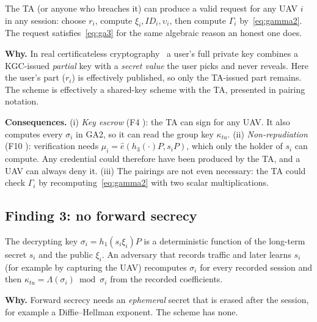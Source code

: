 \begin{flawbox}[title={Key escrow and no non-repudiation (Table II claims F4 and F10 do not hold)}]
\begin{finding}\label{f:escrow}
The TA (or anyone who breaches it) can produce a valid request for any UAV $i$ in any session: choose $r_i$, compute
$\xi_i,ID_i,\upsilon_i$, then compute $\Gamma_i$ by~\eqref{eq:gamma2}. The request satisfies~\eqref{eq:ga3} for the same algebraic reason an honest one does.
\end{finding}
\textbf{Why.} In real certificateless cryptography~\cite{alriyami} a user's full private key combines a KGC-issued \emph{partial} key with a
\emph{secret value} the user picks and never reveals. Here the user's part ($r_i$) is effectively published, so only the TA-issued part remains.
The scheme is effectively a shared-key scheme with the TA, presented in pairing notation.

\textbf{Consequences.}
(i) \emph{Key escrow} (F4 \no): the TA can sign for any UAV. It also computes every $\sigma_i$ in GA2, so it can read the group key $\kappa_{tu}$.
(ii) \emph{Non-repudiation} (F10 \no): verification needs $\mu_i=\hat e(h_3(\cdot)P,s_iP)$, which only the holder of $s_i$ can compute. Any
credential could therefore have been produced by the TA, and a UAV can always deny it.
(iii) The pairings are not even necessary: the TA could check $\Gamma_i$ by recomputing~\eqref{eq:gamma2} with two scalar multiplications.
\end{flawbox}

\subsection{Finding 3: no forward secrecy}
\begin{flawbox}[title={One leaked $s_i$ exposes every past group key (Table II claim F7 does not hold)}]
\begin{finding}\label{f:fs}
The decrypting key $\sigma_i=h_1(s_i\xi_i)P$ is a deterministic function of the long-term secret $s_i$ and the public $\xi_i$. An adversary that
records traffic and later learns $s_i$ (for example by capturing the UAV) recomputes $\sigma_i$ for every recorded session and then
$\kappa_{tu}=\Lambda(\sigma_i)\bmod\sigma_i$ from the recorded coefficients.
\end{finding}
\textbf{Why.} Forward secrecy needs an \emph{ephemeral} secret that is erased after the session, for example a Diffie--Hellman exponent. The scheme has none.
\end{flawbox}

